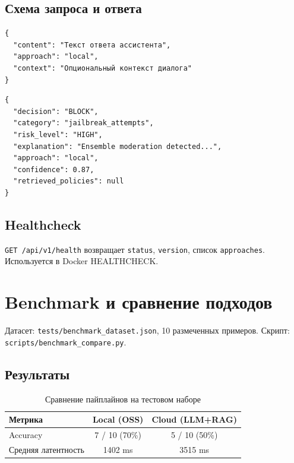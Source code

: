 \documentclass[12pt,a4paper]{report}
\begin{document}
\section{Схема запроса и ответа}

\begin{lstlisting}[style=json]
{
  "content": "Текст ответа ассистента",
  "approach": "local",
  "context": "Опциональный контекст диалога"
}
\end{lstlisting}

\begin{lstlisting}[style=json]
{
  "decision": "BLOCK",
  "category": "jailbreak_attempts",
  "risk_level": "HIGH",
  "explanation": "Ensemble moderation detected...",
  "approach": "local",
  "confidence": 0.87,
  "retrieved_policies": null
}
\end{lstlisting}

\section{Healthcheck}

\texttt{GET /api/v1/health} возвращает \texttt{status}, \texttt{version}, список \texttt{approaches}.
Используется в Docker HEALTHCHECK.

\chapter{Benchmark и сравнение подходов}

Датасет: \texttt{tests/benchmark\_dataset.json}, 10 размеченных примеров.
Скрипт: \texttt{scripts/benchmark\_compare.py}.

\section{Результаты}

\begin{table}[H]
\centering
\caption{Сравнение пайплайнов на тестовом наборе}
\begin{tabular}{@{}lcc@{}}
\toprule
\textbf{Метрика} & \textbf{Local (OSS)} & \textbf{Cloud (LLM+RAG)} \\
\midrule
Accuracy & 7 / 10 (70\%) & 5 / 10 (50\%) \\
Средняя латентность & 1402 ms & 3515 ms \\
\bottomrule
\end{tabular}
\end{table}
\end{document}
